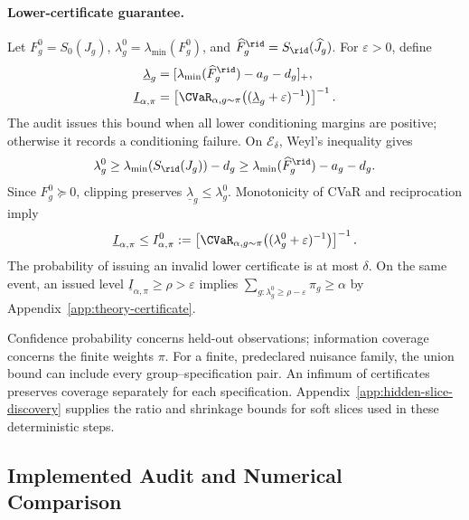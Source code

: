 \paragraph{Lower-certificate guarantee.}
Let $F_g^0=S_0(J_g)$, $\lambda_g^0=\lambda_{\min}(F_g^0)$, and $\widehat F_g^{\rid}=S_{\rid}(\widehat J_g)$. For $\varepsilon>0$, define
\begin{equation}
\begin{aligned}
\underline\lambda_g&=[\lambda_{\min}(\widehat F_g^{\rid})-a_g-d_g]_+,\\
\underline I_{\alpha,\pi}
&=\left[\CVaR_{\alpha,g\sim\pi}
\bigl((\underline\lambda_g+\varepsilon)^{-1}\bigr)\right]^{-1}.
\end{aligned}
\label{eq:appB-lower-certificate}
\end{equation}
The audit issues this bound when all lower conditioning margins are positive; otherwise it records a conditioning failure. On $\mathcal E_\delta$, Weyl's inequality gives
\begin{equation}
\lambda_g^0\ge\lambda_{\min}(S_{\rid}(J_g))-d_g
\ge\lambda_{\min}(\widehat F_g^{\rid})-a_g-d_g.
\label{eq:appB-weyl}
\end{equation}
Since $F_g^0\succeq0$, clipping preserves $\underline\lambda_g\le\lambda_g^0$. Monotonicity of CVaR and reciprocation imply
\begin{equation}
\underline I_{\alpha,\pi}\le I^0_{\alpha,\pi}
:=\left[\CVaR_{\alpha,g\sim\pi}
\bigl((\lambda_g^0+\varepsilon)^{-1}\bigr)\right]^{-1}.
\label{eq:appB-certificate-guarantee}
\end{equation}
The probability of issuing an invalid lower certificate is at most $\delta$. On the same event, an issued level $\underline I_{\alpha,\pi}\ge\rho>\varepsilon$ implies
$\sum_{g:\lambda_g^0\ge\rho-\varepsilon}\pi_g\ge\alpha$ by Appendix~\ref{app:theory-certificate}.

Confidence probability concerns held-out observations; information coverage concerns the finite weights $\pi$. For a finite, predeclared nuisance family, the union bound can include every group--specification pair. An infimum of certificates preserves coverage separately for each specification. Appendix~\ref{app:hidden-slice-discovery} supplies the ratio and shrinkage bounds for soft slices used in these deterministic steps.

\subsection{Implemented Audit and Numerical Comparison}
\label{app:implemented-audit}

